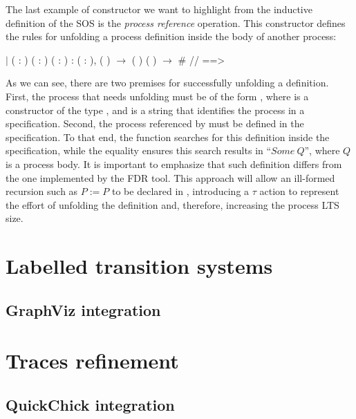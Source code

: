 The last example of constructor we want to highlight from the inductive definition of the SOS is the \emph{process reference} operation. This constructor defines the rules for unfolding a process definition inside the body of another process:

\begin{coqdoccode}
	\coqdocnoindent
	\ensuremath{|}  ( : ) ( : ) ( : ) :\coqdoceol
	\coqdocindent{1.00em}
	\coqdockw{\ensuremath{\forall}} ( : ),\coqdoceol
	\coqdocindent{3.00em}
	  ( ) \ensuremath{\rightarrow}\coqdoceol
	\coqdocindent{3.00em}
	 (  ) ( ) \ensuremath{\rightarrow}\coqdoceol
	\coqdocindent{3.00em}
	 \#  //  ==> \coqdoceol
\end{coqdoccode}

As we can see, there are two premises for successfully unfolding a definition. First, the process that needs unfolding must be of the form  , where  is a constructor of the type , and  is a string that identifies the process in a specification. Second, the process referenced by   must be defined in the specification. To that end, the function  searches for this definition inside the specification, while the equality ensures this search results in ``$ Some \ Q $'', where $ Q $ is a process body. It is important to emphasize that such definition differs from the one implemented by the FDR tool. This approach will allow an ill-formed recursion such as $ P := P $ to be declared in \CSPcoq{}, introducing a $ \tau $ action to represent the effort of unfolding the definition and, therefore, increasing the process LTS size.

\section{Labelled transition systems}
\label{section:lts}

\subsection{GraphViz integration}

\section{Traces refinement}
\label{section:traces}

\subsection{QuickChick integration}
